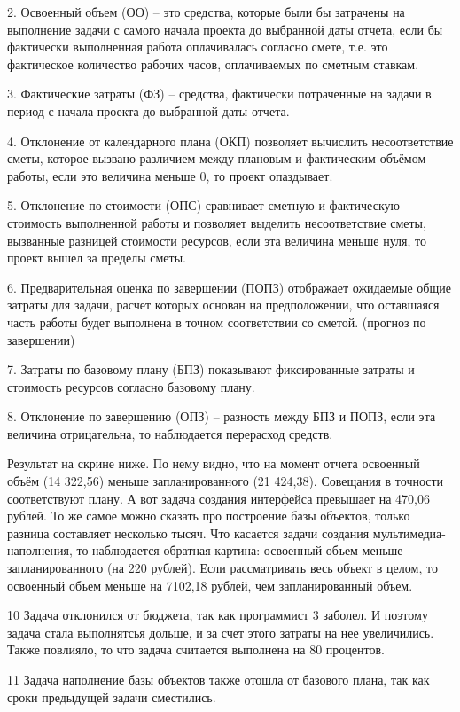 2. Освоенный объем (ОО) – это средства, которые были бы затрачены на
выполнение задачи с самого начала проекта до выбранной даты отчета,
если бы фактически выполненная работа оплачивалась согласно смете,
т.е. это фактическое количество рабочих часов, оплачиваемых по
сметным ставкам.

3. Фактические затраты (ФЗ) – средства, фактически потраченные на
задачи в период с начала проекта до выбранной даты отчета.

4. Отклонение от календарного плана (ОКП) позволяет вычислить
несоответствие сметы, которое вызвано различием между плановым и
фактическим объёмом работы, если это величина меньше 0, то проект
опаздывает.

5. Отклонение по стоимости (ОПС) сравнивает сметную и фактическую
стоимость выполненной работы и позволяет выделить несоответствие
сметы, вызванные разницей стоимости ресурсов, если эта величина
меньше нуля, то проект вышел за пределы сметы.

6. Предварительная оценка по завершении (ПОПЗ) отображает
ожидаемые общие затраты для задачи, расчет которых основан на
предположении, что оставшаяся часть работы будет выполнена в точном
соответствии со сметой. (прогноз по завершении)

7. Затраты по базовому плану (БПЗ) показывают фиксированные
затраты и стоимость ресурсов согласно базовому плану.

8. Отклонение по завершению (ОПЗ) – разность между БПЗ и ПОПЗ,
если эта величина отрицательна, то наблюдается перерасход средств.

Результат на скрине ниже. По нему видно, что на момент отчета освоенный
объём (14 322,56) меньше запланированного (21 424,38). Совещания в
точности соответствуют плану. А вот задача создания интерфейса превышает
на 470,06 рублей. То же самое можно сказать про построение базы объектов,
только разница составляет несколько тысяч.
Что касается задачи создания мультимедиа-наполнения, то наблюдается
обратная картина: освоенный объем меньше запланированного (на 220 рублей).
Если рассматривать весь объект в целом, то освоенный объем меньше на
7102,18 рублей, чем запланированный объем.

10 Задача отклонился от бюджета, так как программист 3 заболел.
И поэтому задача стала выполнятсья дольше, и за счет этого затраты на нее увеличились.
Также повлияло, то что задача считается выполнена на 80 процентов.

11 Задача наполнение базы объектов также отошла от базового плана, так как сроки предыдущей задачи сместились.


